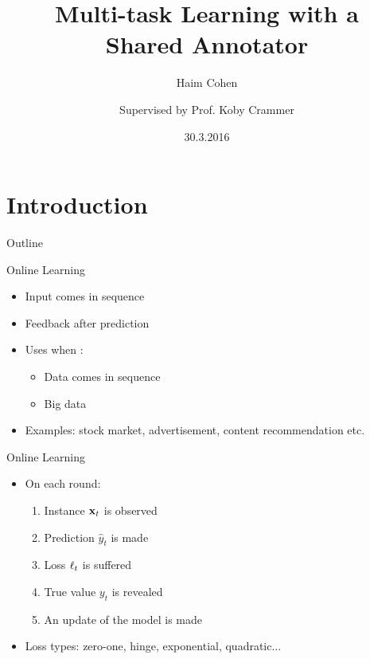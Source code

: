 \documentclass{beamer}
\title []{Multi-task Learning with a  \\Shared Annotator}    %
\author [H. Cohen and K. Crammer]{Haim Cohen \and \newline\newline  Supervised by Prof. Koby Crammer\newline\newline}
\institute [Technion]{Faculty of Electrical Engineering, Technion\\
Israel Institute of Technology}
\date[March 30th, 2016]{30.3.2016}
\begin{document}
\maketitle
\section{Introduction}

\begin{frame}{Outline}
  \tableofcontents[pausesections]
\end{frame}


\begin{frame}{Online Learning}
\begin{itemize}
\item Input  comes in sequence \newline
\item Feedback after prediction  \newline
\item   Uses when  : \newline
\begin{itemize}
\item Data comes in sequence \newline
\item Big data \newline
\end{itemize}
\item Examples: stock market, advertisement, content recommendation etc.\newline

\end{itemize}
\end{frame}


\begin{frame}{Online Learning}
\begin{itemize}
\item On each round:\newline
\begin{enumerate}
\item Instance $\mathbf{x}_{t}$ is observed\newline
\item Prediction $\hat{y}_t$ is made\newline
\item Loss $\ell_{t}$ is suffered\newline
\item True value $y_t$ is revealed\newline
\item An update of the model is made\newline
\end{enumerate}
\item Loss types: zero-one, hinge, exponential, quadratic...
\end{itemize}
\end{frame}
\end{document}
